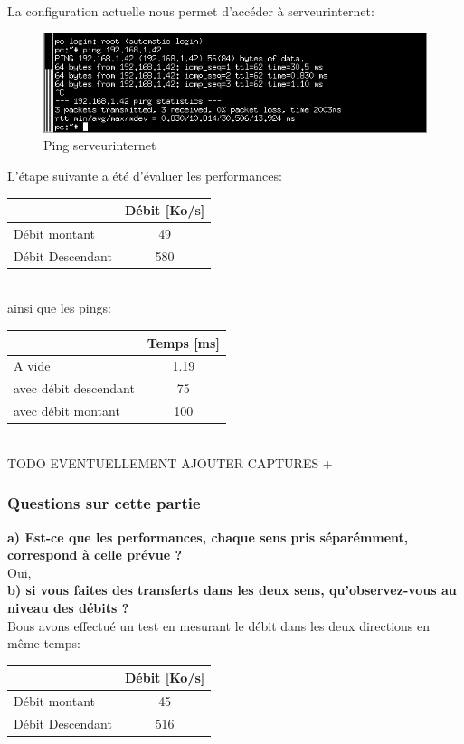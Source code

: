 \documentclass{article}
\begin{document}
La configuration actuelle nous permet d'accéder à serveurinternet:
\begin{figure}[h]
  \centering
  \includegraphics[width=\linewidth]{./captures/4-ping.png}
  \caption{Ping serveurinternet}
  \label{fig:token-bucket}
\end{figure}
\newpage

L'étape suivante a été d'évaluer les performances:

\begin{tabular}{|l|c|}
  \hline
   & Débit [Ko/s]\\
  \hline
  Débit montant & 49 \\
  Débit Descendant & 580 \\
  \hline
\end{tabular}
\\

ainsi que les pings:

\begin{tabular}{|l|c|}
  \hline
   & Temps [ms]\\
  \hline
  A vide & 1.19 \\
  avec débit descendant & 75 \\
  avec débit montant & 100 \\
  \hline
\end{tabular}
\\

TODO EVENTUELLEMENT AJOUTER CAPTURES + 

\subsubsection{Questions sur cette partie}
\textbf{a) Est-ce que les performances, chaque sens pris séparémment, correspond à celle prévue ?}\\
Oui, 
\\

\textbf{b) si vous faites des transferts dans les deux sens, qu'observez-vous au niveau des débits ?}\\
Bous avons effectué un test en mesurant le débit dans les deux directions en même temps:\\
\begin{tabular}{|l|c|}
  \hline
   & Débit [Ko/s]\\
  \hline
  Débit montant & 45 \\
  Débit Descendant & 516 \\
  \hline
\end{tabular}
\\
\end{document}
